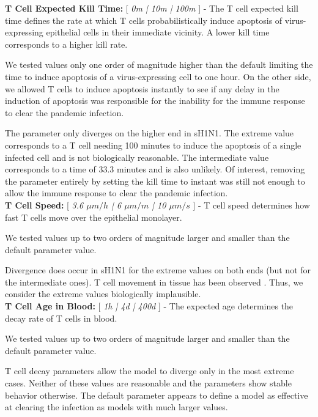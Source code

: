 \documentclass[preprint,10pt,authoryear]{article}
\begin{document}
\textbf{T Cell Expected Kill Time:} [ \textit{0m | 10m | 100m} ]  - The T cell expected kill time defines the rate at which T cells probabilistically induce apoptosis of  virus-expressing epithelial cells in their immediate vicinity.  A lower kill time corresponds to a higher kill rate. 

We tested values only one order of magnitude higher than the default limiting the time to induce apoptosis of a virus-expressing cell to one hour.  On the other side, we allowed T cells to induce apoptosis instantly to see if any delay in the induction of apoptosis was responsible for the inability for the immune response to clear the pandemic infection.

The parameter only diverges on the higher end in sH1N1.  The extreme value corresponds to a T cell needing 100 minutes to induce the apoptosis of a single infected cell and is not biologically reasonable.  The intermediate value corresponds to a time of 33.3 minutes and is also unlikely.  Of interest, removing the parameter entirely by setting the kill time to instant was still not enough to allow the immune response to clear the pandemic infection. \\


\textbf{T Cell Speed:} [ \textit{3.6 $\mu m/h$ | 6 $\mu m/m$ | 10 $\mu m/s$} ] - T cell speed determines how fast T cells move over the epithelial monolayer.

We tested values up to two orders of magnitude larger and smaller than the default parameter value.

Divergence does occur in sH1N1 for the extreme values on both ends (but not for the intermediate ones).  T cell movement in tissue has been observed \citep{Egen2011}.  Thus, we consider the extreme values biologically implausible.  \\


\textbf{T Cell Age in Blood:} [ \textit{1h |  4d | 400d} ] - The expected age determines the decay rate of T cells in blood.  

We tested values up to two orders of magnitude larger and smaller than the default parameter value.

T cell decay parameters allow the model to diverge only in the most extreme cases.  Neither of these values are reasonable and the parameters show stable behavior otherwise.  The default parameter appears to define a model as effective at clearing the infection as models with much larger values. \\
\end{document}
